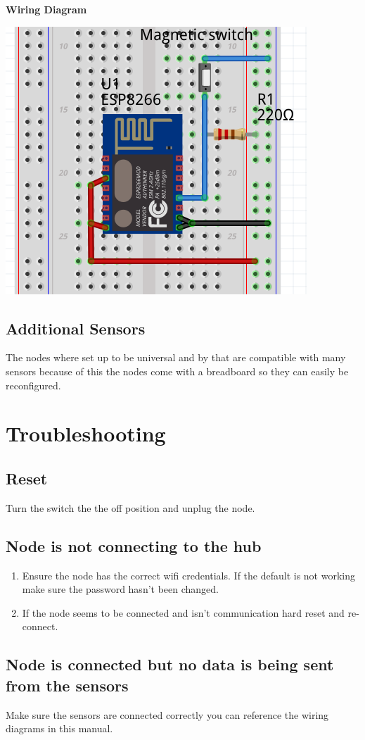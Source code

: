 \documentclass [10pt]{book}
\begin{document}
      \textbf{Wiring Diagram}\\
      \begin{center}
        \includegraphics[scale=0.25]{door-cir.png}
        \end{center}
    \subsection{Additional Sensors}
      The nodes where set up to be universal and by that are compatible with
      many sensors because of this the nodes come with a breadboard so they can
      easily be reconfigured.\\
\newpage
  \section{Troubleshooting}
  \subsection{Reset}
  Turn the switch the the off position and unplug the node.
  \subsection{Node is not connecting to the hub}
  \begin{enumerate}
    \item Ensure the node has the correct wifi credentials. If the default is not
    working make sure the password hasn't been changed.
    \item If the node seems to be connected and isn't communication hard reset and re-connect.
  \end{enumerate}
  \subsection{Node is connected but no data is being sent from the sensors}
  Make sure the sensors are connected correctly you can reference the wiring diagrams
  in this manual.
\end{document}
